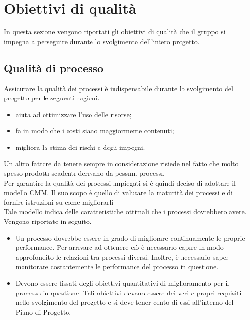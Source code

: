 
\section{Obiettivi di qualità}
	In questa sezione vengono riportati gli obiettivi di qualità che il gruppo \groupname{} si impegna a perseguire durante lo svolgimento dell'intero 
	progetto.
	\subsection{Qualità di processo}
		Assicurare la qualità dei processi è indispensabile durante lo svolgimento del progetto per le seguenti ragioni:
		\begin{itemize}
			\item aiuta ad ottimizzare l'uso delle risorse;
			\item fa in modo che i costi siano maggiormente contenuti;
			\item migliora la stima dei rischi e degli impegni.
		\end{itemize}
		Un altro fattore da tenere sempre in considerazione risiede nel fatto che molto spesso prodotti scadenti derivano da pessimi processi.\\
		Per garantire la qualità dei processi impiegati si è quindi deciso di adottare il modello CMM. Il suo scopo è quello di valutare la maturità dei 
		processi e di fornire istruzioni su come migliorarli.\\
		Tale modello indica delle caratteristiche ottimali che i processi dovrebbero avere. Vengono riportate in seguito.
		\begin{itemize}
			\item Un processo dovrebbe essere in grado di migliorare continuamente le proprie performance. Per arrivare ad ottenere ciò è necessario 
			capire in modo approfondito le relazioni tra processi diversi. Inoltre, è necessario saper monitorare costantemente le performance del 
			processo in questione.
			\item Devono essere fissati degli obiettivi quantitativi di miglioramento per il processo in questione. Tali obiettivi devono essere dei veri 
			e propri requisiti nello svolgimento del progetto e si deve tener conto di essi all'interno del Piano di Progetto.
		\end{itemize}
